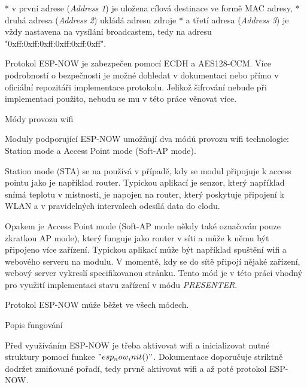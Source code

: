 \begitems
* v první adrese ({\em Address 1}) je uložena cílová destinace ve formě MAC adresy,
* druhá adresa ({\em Address 2}) ukládá adresu zdroje
* a třetí adresa ({\em Address 3}) je vždy nastavena na vysílání broadcastem, tedy na adresu "0xff:0xff:0xff:0xff:0xff:0xff".
\enditems

Protokol ESP-NOW je zabezpečen pomocí ECDH a AES128-CCM. Více podrobností o bezpečnosti je možné dohledat v dokumentaci  nebo přímo v oficiální repozitáři implementace protokolu. Jelikož šifrování nebude při implementaci použito, nebudu se mu v této práce věnovat více.

\secc Módy provozu wifi

Moduly podporující ESP-NOW umožňují dva módů provozu wifi technologie: Station mode a Access Point mode (Soft-AP mode).

{\sbf Station mode} (STA) se na používá v případě, kdy se modul připojuje k access pointu jako je například router. Typickou aplikací je senzor, který například snímá teplotu v místnosti, je napojen na router, který poskytuje připojení k WLAN a v pravidelných intervalech odesílá data do clodu.

Opakem je {\sbf Access Point mode} (Soft-AP mode někdy také označován pouze zkratkou AP mode), který funguje jako router v síti a může k němu být připojeno více zařízení. Typickou aplikací může být například spuštění wifi a webového serveru na modulu. V momentě, kdy se do sítě připojí nějaké zařízení, webový server vykreslí specifikovanou stránku.
Tento mód je v této práci vhodný pro využití implementaci stavu zařízení v módu {\em PRESENTER}.

Protokol ESP-NOW může běžet ve všech módech.

\secc Popis fungování

Před využíváním ESP-NOW je třeba aktivovat wifi a {\sbf inicializovat} nutné struktury pomocí funkce $"esp_now_init()"$. Dokumentace doporučuje striktně dodržet zmiňované pořadí, tedy prvně aktivovat wifi a až poté protokol ESP-NOW.

